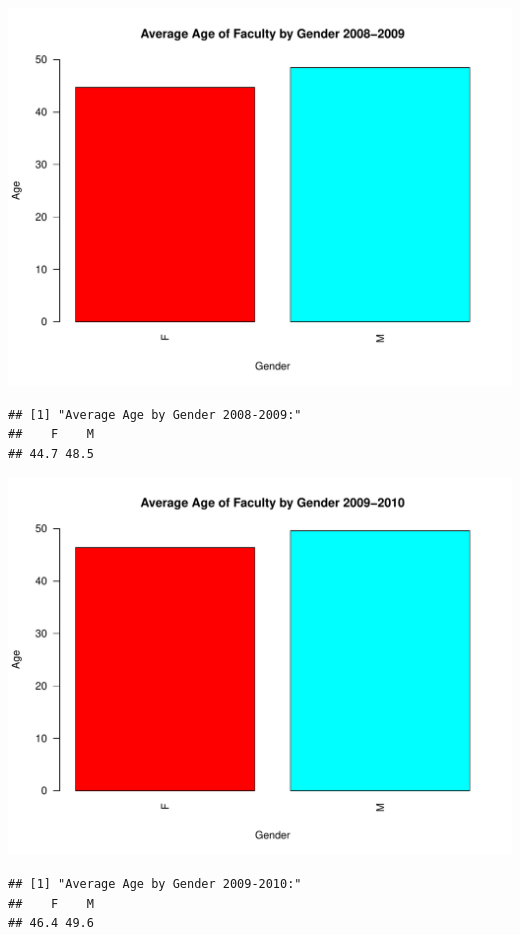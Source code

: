 \documentclass[12pt,a4paper]{article}\usepackage[]{graphicx}\usepackage[]{color}
\makeatletter
\def\maxwidth{ %
  \ifdim\Gin@nat@width>\linewidth
    \linewidth
  \else
    \Gin@nat@width
  \fi
}
\newenvironment{kframe}{%
 \def\at@end@of@kframe{}%
 \ifinner\ifhmode%
  \def\at@end@of@kframe{\end{minipage}}%
  \begin{minipage}{\columnwidth}%
 \fi\fi%
 \def\FrameCommand##1{\hskip\@totalleftmargin \hskip-\fboxsep
 \colorbox{shadecolor}{##1}\hskip-\fboxsep
     \hskip-\linewidth \hskip-\@totalleftmargin \hskip\columnwidth}%
 \MakeFramed {\advance\hsize-\width
   \@totalleftmargin\z@ \linewidth\hsize
   \@setminipage}}%
 {\par\unskip\endMakeFramed%
 \at@end@of@kframe}
\newenvironment{knitrout}{}{} %
\theoremstyle{definition}
\makeatother
\begin{document}
\begin{knitrout}
\includegraphics[width=\maxwidth]{figure/unnamed-chunk-10-5} 
\begin{kframe}\begin{verbatim}
## [1] "Average Age by Gender 2008-2009:"
##    F    M 
## 44.7 48.5
\end{verbatim}
\end{kframe}
\includegraphics[width=\maxwidth]{figure/unnamed-chunk-10-6} 
\begin{kframe}\begin{verbatim}
## [1] "Average Age by Gender 2009-2010:"
##    F    M 
## 46.4 49.6
\end{verbatim}
\end{kframe}

\end{knitrout}
\end{document}
